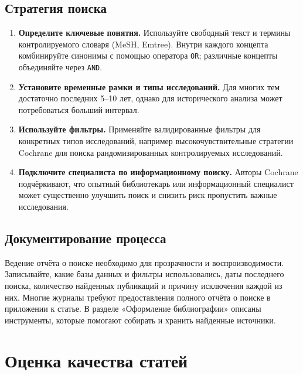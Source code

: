 \documentclass[
  russian,
  12pt,
  a4paper,
]{article}
\providecommand{\tightlist}{%
  \setlength{\itemsep}{0pt}\setlength{\parskip}{0pt}}
\begin{document}
\section{Стратегия
поиска}\label{ux441ux442ux440ux430ux442ux435ux433ux438ux44f-ux43fux43eux438ux441ux43aux430}

\begin{enumerate}
\def\labelenumi{\arabic{enumi}.}
\tightlist
\item
  \textbf{Определите ключевые понятия.} Используйте свободный текст и
  термины контролируемого словаря (MeSH, Emtree). Внутри каждого
  концепта комбинируйте синонимы с помощью оператора \texttt{OR};
  различные концепты объединяйте через \texttt{AND}.
\item
  \textbf{Установите временные рамки и типы исследований.} Для многих
  тем достаточно последних 5--10 лет, однако для исторического анализа
  может потребоваться больший интервал.
\item
  \textbf{Используйте фильтры.} Применяйте валидированные фильтры для
  конкретных типов исследований, например высокочувствительные стратегии
  Cochrane для поиска рандомизированных контролируемых исследований.
\item
  \textbf{Подключите специалиста по информационному поиску.} Авторы
  Cochrane подчёркивают, что опытный библиотекарь или информационный
  специалист может существенно улучшить поиск и снизить риск пропустить
  важные исследования.
\end{enumerate}

\section{Документирование
процесса}\label{ux434ux43eux43aux443ux43cux435ux43dux442ux438ux440ux43eux432ux430ux43dux438ux435-ux43fux440ux43eux446ux435ux441ux441ux430}

Ведение отчёта о поиске необходимо для прозрачности и воспроизводимости.
Записывайте, какие базы данных и фильтры использовались, даты последнего
поиска, количество найденных публикаций и причину исключения каждой из
них. Многие журналы требуют предоставления полного отчёта о поиске в
приложении к статье. В разделе «Оформление библиографии» описаны
инструменты, которые помогают собирать и хранить найденные источники.

\chapter{Оценка качества
статей}\label{ux43eux446ux435ux43dux43aux430-ux43aux430ux447ux435ux441ux442ux432ux430-ux441ux442ux430ux442ux435ux439}
\end{document}

